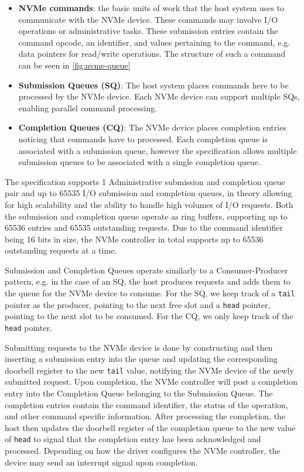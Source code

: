 \begin{itemize}
    \item \textbf{NVMe commands}: the basic units of work that the host system uses to communicate with the NVMe device. These commands may involve I/O operations or administrative tasks. These submission entries contain the command opcode, an identifier, and values pertaining to the command, e.g. data pointers for read/write operations. The structure of such a command can be seen in \autoref{fig:nvme-queue}
    \item \textbf{Submission Queues (SQ)}: The host system places commands here to be processed by the NVMe device. Each NVMe device can support multiple SQs, enabling parallel command processing.
    \item \textbf{Completion Queues (CQ)}: The NVMe device places completion entries noticing that commands have to processed. Each completion queue is associated with a submission queue, however the specification allows multiple submission queues to be associated with a single completion queue.
\end{itemize}

The specification supports 1 Administrative submission and completion queue pair and up to 65535 I/O submission and completion queues, in theory allowing for high scalability and the ability to handle high volumes of I/O requests. Both the submission and completion queue operate as ring buffers, supporting up to 65536 entries and 65535 outstanding requests. Due to the command identifier being 16 bits in size, the NVMe controller in total supports up to 65536 outstanding requests at a time.

Submission and Completion Queues operate similarly to a Consumer-Producer pattern, e.g. in the case of an SQ, the host produces requests and adds them to the queue for the NVMe device to consume. For the SQ, we keep track of a \texttt{tail} pointer as the producer, pointing to the next free slot and a \texttt{head} pointer, pointing to the next slot to be consumed. For the CQ, we only keep track of the \texttt{head} pointer.

Submitting requests to the NVMe device is done by constructing and then inserting a submission entry into the queue and updating the corresponding doorbell register to the new \texttt{tail} value, notifying the NVMe device of the newly submitted request. Upon completion, the NVMe controller will post a completion entry into the Completion Queue belonging to the Submission Queue. The completion entries contain the command identifier, the status of the operation, and other command specific information. After processing the completion, the host then updates the doorbell register of the completion queue to the new value of \texttt{head} to signal that the completion entry has been acknowledged and processed. Depending on how the driver configures the NVMe controller, the device may send an interrupt signal upon completion.

